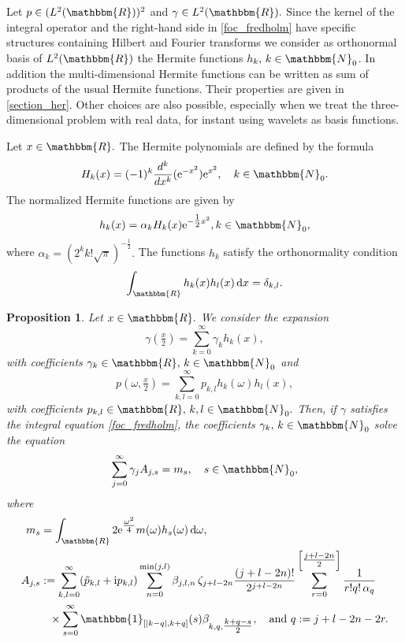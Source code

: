 \documentclass[a4paper,twoside,10pt]{article}
\theoremstyle{break}
\newtheorem{proposition}[proposition]{Proposition}
\theoremstyle{nonumberplain}
\newcommand{\R}{\mathbbm{R}}
\newcommand{\N}{\mathbbm{N}}
\newcommand{\id}{\mathbbm{1}}
\newcommand{\e}{\mathrm e}
\renewcommand{\i}{\mathrm i}
\renewcommand{\d}{\,\mathrm d}
\begin{document}
Let $p \in (L^2 (\R))^2$ and $\gamma \in L^2 (\R). $  Since the kernel of the integral operator and the right-hand side in \eqref{foc_fredholm} have specific structures containing Hilbert and Fourier transforms we consider as orthonormal basis of $L^2 (\R)$ the Hermite functions $h_k , \, k\in \N_0$. In addition the multi-dimensional Hermite functions can be written as sum of products of the usual Hermite functions. Their properties are given in \autoref{section_her}.
Other choices are also possible, especially when we treat the three-dimensional problem with real data, for instant using wavelets as basis functions.

Let $x\in \R.$ The Hermite polynomials are defined by the formula
\begin{equation*}%
H_k (x) = (-1)^k \frac{d^k}{dx^k} (\e^{-x^2}) \e^{x^2}, \quad k \in \N_0 .
\end{equation*} 
The normalized Hermite functions are given by
\begin{equation}\label{her_fun}
h_k (x) = \alpha_k H_k (x) \e^{-\tfrac12 x^2},  k \in \N_0  ,
\end{equation}
where $\alpha_k = (2^k k! \sqrt{\pi})^{-\tfrac12}.$ The functions $h_k$ satisfy the orthonormality condition
\begin{equation*}%
\int_\R h_k (x) h_l (x) \d x = \delta_{k,l} .
\end{equation*}


\begin{proposition}\label{propo_1d}
Let $x\in\R.$ We consider the expansion
\begin{equation}\label{foc_expan_gamma}
\gamma (\tfrac{x}2) = \sum_{k=0}^\infty \gamma_k h_k (x) ,
\end{equation}
with coefficients $\gamma_k \in \R, \, k \in \N_0$  and 
\begin{equation}\label{foc_expan_pat}
p (\omega, \tfrac{x}2) = \sum_{k,l=0}^\infty p_{k,l} h_k (\omega) h_l (x) ,
\end{equation}
with coefficients 
$ p_{k,l} \in \R,\, k,l \in \N_0 . $
Then, if $\gamma$ satisfies the integral equation \eqref{foc_fredholm}, the coefficients $\gamma_k ,\, k\in\N_0$ solve the equation
\begin{equation}\label{1d_full_7}
\sum_{j=0}^\infty \gamma_j A_{j,s} = m_s , \quad s\in \N_0 ,
\end{equation}
where
\begin{equation*}%
\begin{aligned}
m_s &=  \int_\R 2 \e^{
\tfrac{\omega^2}4} m (\omega) h_s (\omega) \d \omega,  \\
A_{j,s} &:=  \sum_{k,l=0}^\infty (\tilde p_{k,l} +\i p_{k,l} )  \sum_{n=0}^{\min (j,l)} \beta_{j,l,n} \,\zeta_{j+l-2n}\frac{(j+l-2n)!}{2^{j+l-2n}} 
\sum_{r=0}^{\left[ \tfrac{j+l-2n}{2}\right] } \frac{1}{r!q! \,\alpha_q} 
\\
&\phantom{=} \times \sum_{s=0}^\infty \id_{[\vert k-q\vert,k+q ]}(s) \beta_{k,q,\tfrac{k+q-s}2}  , \quad \mbox{and } q := j+l-2n-2r. 
\end{aligned}
\end{equation*}

\end{proposition}
\end{document}

